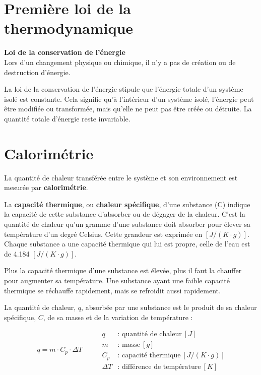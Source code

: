 \documentclass[
  11pt,
  a4paper,
  openany]{book}
\begin{document}
\hypertarget{premiuxe8re-loi-de-la-thermodynamique}{%
\section{Première loi de la thermodynamique}\label{premiuxe8re-loi-de-la-thermodynamique}}

\begin{tcolorbox}
\textbf{Loi de la conservation de l'énergie}\\
Lors d'un changement physique ou chimique, il n'y a pas de création ou de destruction d'énergie.

\end{tcolorbox}

La loi de la conservation de l'énergie stipule que l'énergie totale d'un système isolé est constante. Cela signifie qu'à l'intérieur d'un système isolé, l'énergie peut être modifiée ou transformée, mais qu'elle ne peut pas être créée ou détruite. La quantité totale d'énergie reste invariable.

\hypertarget{calorimuxe9trie}{%
\section{Calorimétrie}\label{calorimuxe9trie}}

La quantité de chaleur transférée entre le système et son environnement est mesurée par \textbf{calorimétrie}.

La \textbf{capacité thermique}, ou \textbf{chaleur spécifique}, d'une substance (C) indique la capacité de cette substance d'absorber ou de dégager de la chaleur. C'est la quantité de chaleur qu'un gramme d'une substance doit absorber pour élever sa température d'un degré Celsius. Cette grandeur est exprimée en \([J/(K \cdot g)]\). Chaque substance a une capacité thermique qui lui est propre, celle de l'eau est de 4.184 \([J/(K \cdot g)]\).

Plus la capacité thermique d'une substance est élevée, plus il faut la chauffer pour augmenter sa température. Une substance ayant une faible capacité thermique se réchauffe rapidement, mais se refroidit aussi rapidement.

La quantité de chaleur, \(q\), absorbée par une substance est le produit de sa chaleur spécifique, \(C\), de sa masse et de la variation de température :

\[
\begin{split}
q = m \cdot C_p \cdot \Delta T
\end{split}
\qquad
\begin{split}
q & \text{: quantité de chaleur}\ [J] \\
m & \text{: masse}\ [g] \\
C_p & \text{: capacité thermique}\ [J/(K \cdot g)] \\
\Delta T & \text{: différence de température}\ [K]
\end{split}
\]
\end{document}
